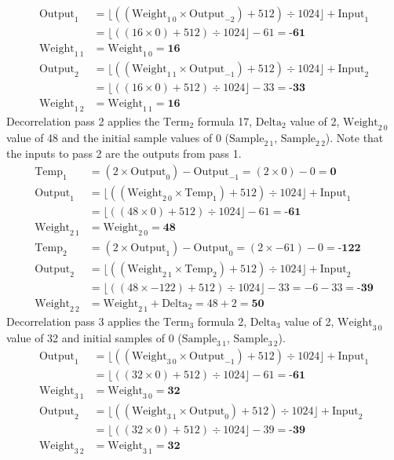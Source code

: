 \begin{align*}
\text{Output}_1 &= \lfloor ((\text{Weight}_{1~0} \times \text{Output}_{-2}) + 512) \div 1024 \rfloor + \text{Input}_1 \\
&= \lfloor ((16 \times 0) + 512) \div 1024 \rfloor - 61 = \textbf{-61} \\
\text{Weight}_{1~1} &= \text{Weight}_{1~0} = \textbf{16} \\
\text{Output}_2 &= \lfloor ((\text{Weight}_{1~1} \times \text{Output}_{-1}) + 512) \div 1024 \rfloor + \text{Input}_2 \\
&= \lfloor ((16 \times 0) + 512) \div 1024 \rfloor - 33 = \textbf{-33} \\
\text{Weight}_{1~2} &= \text{Weight}_{1~1} = \textbf{16}
\end{align*}
Decorrelation pass 2 applies the $\text{Term}_2$ formula 17,
$\text{Delta}_2$ value of 2, $\text{Weight}_{2~0}$ value of 48
and the initial sample values of 0 ($\text{Sample}_{2~1}$,
$\text{Sample}_{2~2}$).  Note that the inputs to pass 2 are the
outputs from pass 1.
\begin{align*}
\text{Temp}_1 &= (2 \times \text{Output}_0) - \text{Output}_{-1} = (2 \times 0) - 0 = \textbf{0} \\
\text{Output}_1 &= \lfloor ((\text{Weight}_{2~0} \times \text{Temp}_1) + 512) \div 1024 \rfloor + \text{Input}_1 \\
&= \lfloor ((48 \times 0) + 512) \div 1024 \rfloor - 61 = \textbf{-61} \\
\text{Weight}_{2~1} &= \text{Weight}_{2~0} = \textbf{48} \\
\text{Temp}_2 &= (2 \times \text{Output}_1) - \text{Output}_{0} = (2 \times -61) - 0 = \textbf{-122} \\
\text{Output}_2 &= \lfloor ((\text{Weight}_{2~1} \times \text{Temp}_2) + 512) \div 1024 \rfloor + \text{Input}_2 \\
&= \lfloor ((48 \times -122) + 512) \div 1024 \rfloor - 33 = -6 - 33 = \textbf{-39} \\
\text{Weight}_{2~2} &= \text{Weight}_{2~1} + \text{Delta}_2 = 48 + 2 = \textbf{50}
\end{align*}
Decorrelation pass 3 applies the $\text{Term}_3$ formula 2,
$\text{Delta}_3$ value of 2, $\text{Weight}_{3~0}$ value of 32
and initial samples of 0 ($\text{Sample}_{3~1}$, $\text{Sample}_{3~2}$).
\begin{align*}
\text{Output}_1 &= \lfloor ((\text{Weight}_{3~0} \times \text{Output}_{-1}) + 512) \div 1024 \rfloor + \text{Input}_1 \\
&= \lfloor ((32 \times 0) + 512) \div 1024 \rfloor - 61 = \textbf{-61} \\
\text{Weight}_{3~1} &= \text{Weight}_{3~0} = \textbf{32} \\
\text{Output}_2 &= \lfloor ((\text{Weight}_{3~1} \times \text{Output}_0) + 512) \div 1024 \rfloor + \text{Input}_2 \\
&= \lfloor ((32 \times 0) + 512) \div 1024 \rfloor - 39 = \textbf{-39} \\
\text{Weight}_{3~2} &= \text{Weight}_{3~1} = \textbf{32}
\end{align*}
